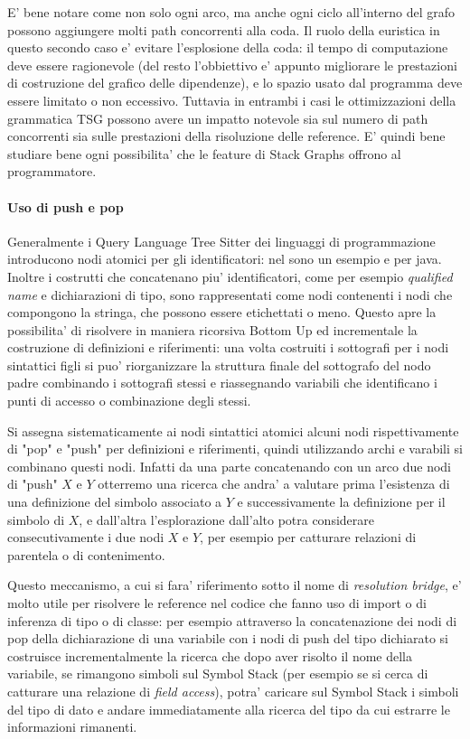E' bene notare come non solo ogni arco, ma anche ogni ciclo all'interno del grafo possono aggiungere molti path concorrenti alla coda.
Il ruolo della euristica in questo secondo caso e' evitare l'esplosione della coda: il tempo di computazione deve essere ragionevole (del resto l'obbiettivo e' appunto migliorare le prestazioni di costruzione del grafico delle dipendenze), e lo spazio usato dal programma deve essere limitato o non eccessivo.
Tuttavia in entrambi i casi le ottimizzazioni della grammatica TSG possono avere un impatto notevole sia sul numero di path concorrenti sia sulle prestazioni della risoluzione delle reference. E' quindi bene studiare bene ogni possibilita' che le feature di Stack Graphs offrono al programmatore.

\paragraph{Uso di push e pop}

Generalmente i Query Language Tree Sitter dei linguaggi di programmazione introducono nodi atomici per gli identificatori: nel sono un esempio \emph{} e \emph{} per java.
Inoltre i costrutti che concatenano piu' identificatori, come per esempio \emph{qualified name} e dichiarazioni di tipo, sono rappresentati come nodi contenenti i nodi che compongono la stringa, che possono essere etichettati o meno.
Questo apre la possibilita' di risolvere in maniera ricorsiva Bottom Up ed incrementale la costruzione di definizioni e riferimenti: una volta costruiti i sottografi per i nodi sintattici figli si puo' riorganizzare la struttura finale del sottografo del nodo padre combinando i sottografi stessi e riassegnando variabili che identificano i punti di accesso o combinazione degli stessi.

Si assegna sistematicamente ai nodi sintattici atomici alcuni nodi rispettivamente di "pop" e "push" per definizioni e riferimenti, quindi utilizzando archi e varabili si combinano questi nodi.
Infatti da una parte concatenando con un arco due nodi di "push" $X$ e $Y$ otterremo una ricerca che andra' a valutare prima l'esistenza di una definizione del simbolo associato a $Y$ e successivamente la definizione per il simbolo di $X$, e dall'altra l'esplorazione dall'alto potra considerare consecutivamente i due nodi $X$ e $Y$, per esempio per catturare relazioni di parentela o di contenimento.

Questo meccanismo, a cui si fara' riferimento sotto il nome di \emph{resolution bridge}, e' molto utile per risolvere le reference nel codice che fanno uso di import o di inferenza di tipo o di classe: per esempio attraverso la concatenazione dei nodi di pop della dichiarazione di una variabile con i nodi di push del tipo dichiarato si costruisce incrementalmente la ricerca che dopo aver risolto il nome della variabile, se rimangono simboli sul Symbol Stack (per esempio se si cerca di catturare una relazione di \emph{field access}), potra' caricare sul Symbol Stack i simboli del tipo di dato e andare immediatamente alla ricerca del tipo da cui estrarre le informazioni rimanenti.


